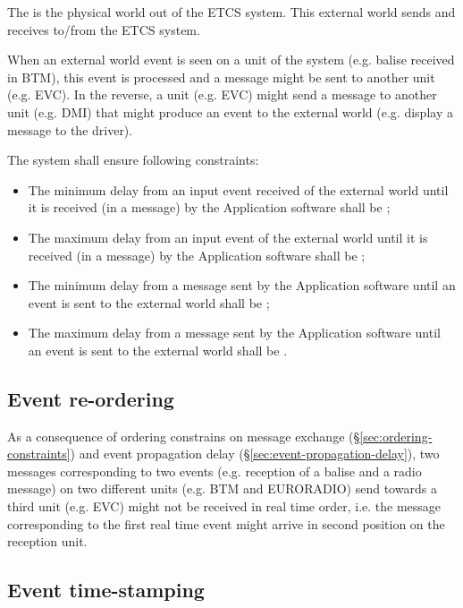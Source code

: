 The  is the physical world out of the ETCS
system. This external world sends and receives  to/from
the ETCS system.

When an external world event is seen on a unit of the system
(e.g. balise received in BTM), this event is processed and a message
might be sent to another unit (e.g. EVC). In the reverse, a unit
(e.g. EVC) might send a message to another unit (e.g. DMI) that might
produce an event to the external world (e.g. display a message to the
driver).

The system shall ensure following constraints:
\begin{itemize}
\item The minimum delay from an input event received of the external
  world until it is received (in a message) by the Application
  software shall be ;
\item The maximum delay from an input event of the external world
  until it is received (in a message) by the Application software
  shall be ;
\item The minimum delay from a message sent by the Application
  software until an event is sent to the external world shall be
  ;
\item The maximum delay from a message sent by the Application
  software until an event is sent to the external world shall be
  .
\end{itemize}


\subsection{Event re-ordering}

As a consequence of ordering constrains on message exchange
(§\ref{sec:ordering-constraints}) and event propagation delay
(§\ref{sec:event-propagation-delay}), two messages corresponding to
two events (e.g. reception of a balise and a radio message) on two
different units (e.g. BTM and EURORADIO) send towards a third unit
(e.g. EVC) might not be received in real time order, i.e. the message
corresponding to the first real time event might arrive in second
position on the reception unit.

\subsection{Event time-stamping}

